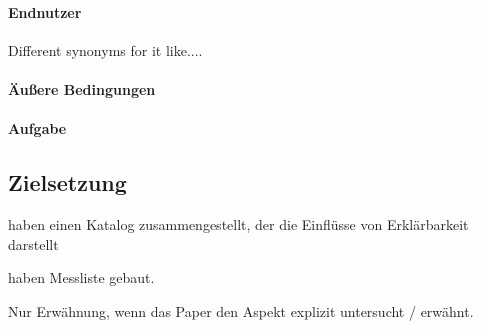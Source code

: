\paragraph{Endnutzer}

Different synonyms for it like....

\paragraph{Äußere Bedingungen}

\paragraph{Aufgabe}

\subsection{Zielsetzung}
\label{subsec:model_objective}

\cite{chazette_knowledge_nodate} haben einen Katalog zusammengestellt, der die Einflüsse von Erklärbarkeit darstellt

\cite{tintarev_designing_nodate} haben Messliste gebaut.

Nur Erwähnung, wenn das Paper den Aspekt explizit untersucht / erwähnt.

